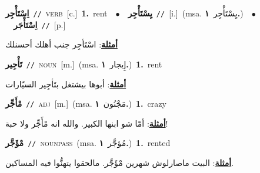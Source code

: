\documentclass[10pt,a4paper,twoside]{article} %
\begin{document}
\begin{multicols}{2}
{{{{{\setlength\topsep{0pt}\textbf{\foreignlanguage{arabic}{اِسْتَأْجِر}}\ {\color{gray}\texttt{//}\color{black}}\ \textsc{verb}\ [c.]\ \textbf{1.}~rent\ \ $\bullet$\ \ \setlength\topsep{0pt}\textbf{\foreignlanguage{arabic}{يِسْتَأْجِر}}\ {\color{gray}\texttt{//}\color{black}}\ [i.]\ \color{gray}(msa. \foreignlanguage{arabic}{يِسْتَأْجِر}~\foreignlanguage{arabic}{\textbf{١.}})\color{black}\ \ $\bullet$\ \ \setlength\topsep{0pt}\textbf{\foreignlanguage{arabic}{اِسْتَأْجَر}}\ {\color{gray}\texttt{//}\color{black}}\ [p.]\  \begin{flushright}\color{gray}\foreignlanguage{arabic}{\textbf{\underline{\foreignlanguage{arabic}{أمثلة}}}: اسْتَأجِر جنب أهلك أحسنلك}\end{flushright}\color{black}} \vspace{2mm}

{\setlength\topsep{0pt}\textbf{\foreignlanguage{arabic}{تَأْجِير}}\ {\color{gray}\texttt{//}\color{black}}\ \textsc{noun}\ [m.]\ \color{gray}(msa. \foreignlanguage{arabic}{إِيجار}~\foreignlanguage{arabic}{\textbf{١.}})\color{black}\ \textbf{1.}~rent\  \begin{flushright}\color{gray}\foreignlanguage{arabic}{\textbf{\underline{\foreignlanguage{arabic}{أمثلة}}}: أبوها بيشتغل بتَأجِير السيّارات}\end{flushright}\color{black}} \vspace{2mm}

{\setlength\topsep{0pt}\textbf{\foreignlanguage{arabic}{مْأَجِّر}}\ {\color{gray}\texttt{//}\color{black}}\ \textsc{adj}\ [m.]\ \color{gray}(msa. \foreignlanguage{arabic}{مَجْنُون}~\foreignlanguage{arabic}{\textbf{١.}})\color{black}\ \textbf{1.}~crazy\  \begin{flushright}\color{gray}\foreignlanguage{arabic}{\textbf{\underline{\foreignlanguage{arabic}{أمثلة}}}: أمّا شو ابنها الكبير. والله انه مْأَجِّر ولا حبة!}\end{flushright}\color{black}} \vspace{2mm}

{\setlength\topsep{0pt}\textbf{\foreignlanguage{arabic}{مْؤَجَّر}}\ {\color{gray}\texttt{//}\color{black}}\ \textsc{noun\textunderscore pass}\ \color{gray}(msa. \foreignlanguage{arabic}{مُؤجَّر}~\foreignlanguage{arabic}{\textbf{١.}})\color{black}\ \textbf{1.}~rented\  \begin{flushright}\color{gray}\foreignlanguage{arabic}{\textbf{\underline{\foreignlanguage{arabic}{أمثلة}}}: البيت ماصارلوش شهرين مْؤَجَّر. مالحقوا يتهنُّوا فيه المساكين.}\end{flushright}\color{black}} \vspace{2mm}

}}}}
\end{multicols}
\end{document}
